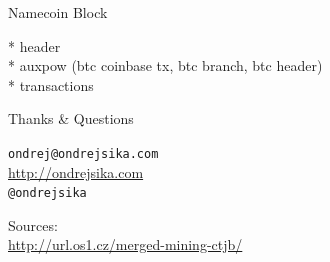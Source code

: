 \documentclass{beamer}
\begin{document}
\begin{frame}

    {\Huge Namecoin Block}\\

    \vspace{5mm}

    * header\\
    * auxpow (btc coinbase tx, btc branch, btc header)\\
    * transactions\\



\end{frame}


\begin{frame}

    {\Huge Thanks \& Questions}\\

    \vspace{1cm}

    \texttt{ondrej@ondrejsika.com}\\
    \url{http://ondrejsika.com}\\
    \texttt{@ondrejsika}\\

    \vspace{1cm}

    Sources:\\
    \url{http://url.os1.cz/merged-mining-ctjb/}
\end{frame}
\end{document}

